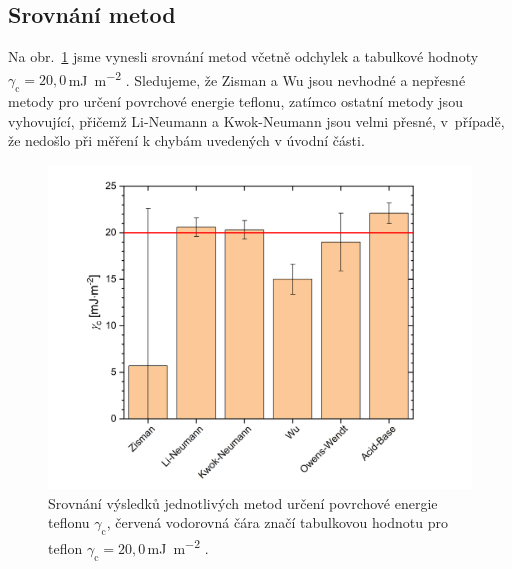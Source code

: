 \documentclass{protokol}
\begin{document}
\subsection{Srovnání metod}
\par Na obr.~\ref{graph:srovnani} jsme vynesli srovnání metod včetně odchylek a 
tabulkové hodnoty $\gamma_{\text{c}} = 
20,0$\,\si{\milli\joule\per\meter\squared} \cite{napetiTeflon}. Sledujeme, že 
Zisman a Wu jsou nevhodné a nepřesné metody pro určení povrchové energie 
teflonu, zatímco ostatní metody jsou vyhovující, přičemž Li-Neumann a 
Kwok-Neumann jsou velmi přesné, v~případě, že nedošlo při měření k chybám 
uvedených v úvodní části.
\begin{figure}[h!]
	\centering
	\includegraphics[width=130mm]{srovnani.png}
	\caption{Srovnání výsledků jednotlivých metod určení povrchové energie 
	teflonu $\gamma_{\text{c}}$, červená vodorovná čára značí tabulkovou 
	hodnotu pro teflon $\gamma_{\text{c}} = 
	20,0$\,\si{\milli\joule\per\meter\squared} \cite{napetiTeflon}.}
	\label{graph:srovnani}
\end{figure}
\end{document}
